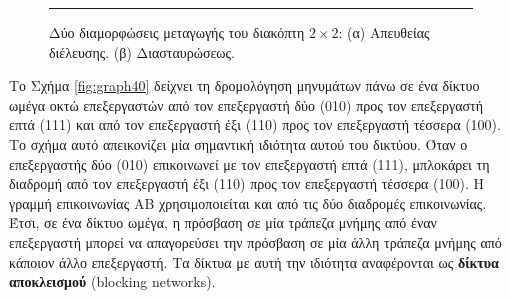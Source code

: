 \documentclass[12pt,a4paper]{article} %
\begin{document}
\begin{figure}[H]
\centering
{}
\noindent\rule{\textwidth}{0.2pt}
\caption{Δύο διαμορφώσεις μεταγωγής του διακόπτη $2 \times 2$:
(α) Απευθείας διέλευσης.
(β) Διασταυρώσεως.}
\label{fig:graph38}
\end{figure}
\vspace{0.3cm}

Το Σχήμα \ref{fig:graph40} δείχνει τη δρομολόγηση μηνυμάτων πάνω σε ένα 
δίκτυο ωμέγα οκτώ επεξεργαστών από τον επεξεργαστή δύο (010) προς τον 
επεξεργαστή επτά (111) και από τον επεξεργαστή έξι (110) προς τον 
επεξεργαστή τέσσερα (100). Το σχήμα αυτό απεικονίζει μία σημαντική 
ιδιότητα αυτού του δικτύου. Όταν ο επεξεργαστής δύο (010) επικοινωνεί με 
τον επεξεργαστή επτά (111), μπλοκάρει τη διαδρομή από τον επεξεργαστή έξι 
(110) προς τον επεξεργαστή τέσσερα (100). Η γραμμή επικοινωνίας ΑΒ 
χρησιμοποιείται και από τις δύο διαδρομές επικοινωνίας. Έτσι, σε ένα 
δίκτυο ωμέγα, η πρόσβαση σε μία τράπεζα μνήμης από έναν επεξεργαστή μπορεί 
να απαγορεύσει την πρόσβαση σε μία άλλη τράπεζα μνήμης από κάποιον άλλο 
επεξεργαστή. Τα δίκτυα με αυτή την ιδιότητα αναφέρονται ως \textbf{δίκτυα αποκλεισμού} 
(blocking networks).
\end{document}
